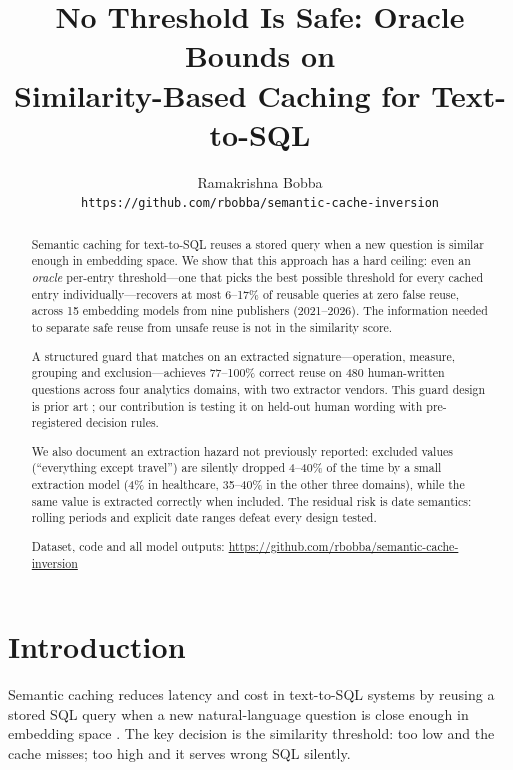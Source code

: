 \documentclass[11pt,a4paper]{article}
\title{No Threshold Is Safe: Oracle Bounds on\\
Similarity-Based Caching for Text-to-SQL}
\author{Ramakrishna Bobba\\
\texttt{https://github.com/rbobba/semantic-cache-inversion}}
\date{}
\begin{document}
\maketitle

\begin{abstract}
Semantic caching for text-to-SQL reuses a stored query when a new question
is similar enough in embedding space. We show that this approach has a hard
ceiling: even an \emph{oracle} per-entry threshold---one that picks the
best possible threshold for every cached entry individually---recovers at
most 6--17\% of reusable queries at zero false reuse, across 15 embedding
models from nine publishers (2021--2026). The information needed to
separate safe reuse from unsafe reuse is not in the similarity score.

A structured guard that matches on an extracted signature---operation,
measure, grouping and exclusion---achieves 77--100\% correct reuse on 480
human-written questions across four analytics domains, with two extractor
vendors. This guard design is prior art \cite{rathore2026cogni,
bindschaedler2026semantic}; our contribution is testing it on held-out
human wording with pre-registered decision rules.

We also document an extraction hazard not previously reported: excluded
values (``everything except travel'') are silently dropped 4--40\% of the
time by a small extraction model (4\% in healthcare, 35--40\% in the other
three domains), while the same value is extracted
correctly when included. The residual risk is date semantics: rolling
periods and explicit date ranges defeat every design tested.

Dataset, code and all model outputs:
\url{https://github.com/rbobba/semantic-cache-inversion}
\end{abstract}

\section{Introduction}

Semantic caching reduces latency and cost in text-to-SQL systems by reusing
a stored SQL query when a new natural-language question is close enough in
embedding space \cite{bang2023gptcache, singh2026semantic}. The key
decision is the similarity threshold: too low and the cache misses; too
high and it serves wrong SQL silently.
\end{document}
